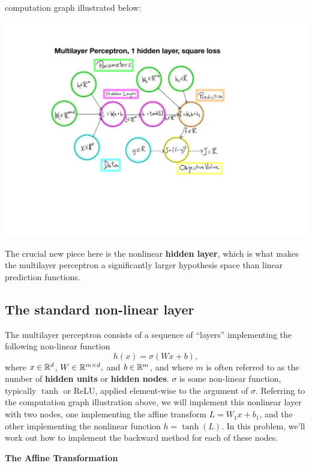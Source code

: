 \documentclass{article}
\newcommand{\nyuparagraph}[1]{\vspace{0.3cm}\textcolor{nyupurple}{\bf \large #1}\\}
\theoremstyle{plain}
\theoremstyle{definition}
\begin{document}
computation graph illustrated below:
\begin{center}
\includegraphics{homework_code/hw7/MLP-computation-graph.pdf}
\par\end{center}

The crucial new piece here is the nonlinear \textbf{hidden layer},
which is what makes the multilayer perceptron a significantly larger
hypothesis space than linear prediction functions.

\subsection{The standard non-linear layer}

The multilayer perceptron consists of a sequence of ``layers'' implementing
the following non-linear function
\[
h(x)=\sigma\left(Wx+b\right),
\]
where $x\in\mathbb{R}^{d}$, $W\in\mathbb{R}^{m\times d},$ and $b\in\mathbb{R}^{m}$,
and where $m$ is often referred to as the number of\textbf{ hidden
units }or\textbf{ hidden nodes}. $\sigma$ is some non-linear function,
typically $\tanh$ or ReLU, applied element-wise to the argument of
$\sigma$. Referring to the computation graph illustration above,
we will implement this nonlinear layer with two nodes, one implementing
the affine transform $L=W_{1}x+b_{1}$, and the other implementing
the nonlinear function $h=\tanh(L)$. In this problem, we'll work
out how to implement the backward method for each of these nodes.

\nyuparagraph{The Affine Transformation}
\end{document}
